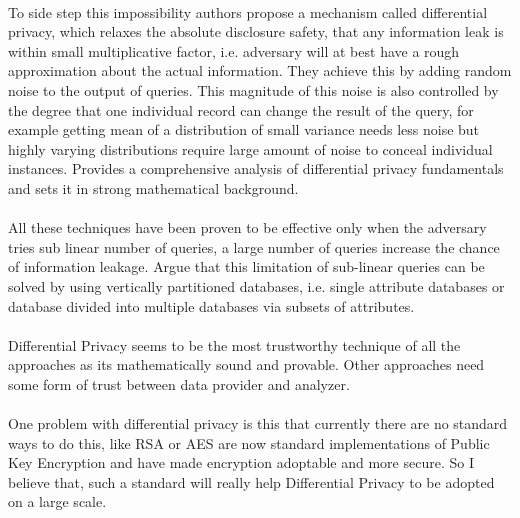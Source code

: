 \documentclass[12pt]{report}
\begin{document}
\paragraph{}
To side step this impossibility authors propose a mechanism called differential privacy, which relaxes the absolute disclosure safety, that any information leak is within small multiplicative factor, i.e. adversary will at best have a rough approximation about the actual information. They achieve this by adding random noise to the output of queries. This magnitude of this noise is also controlled by the degree that one individual record can change the result of the query, for example getting mean of a distribution of small variance needs less noise but highly varying distributions require large amount of noise to conceal individual instances. \cite{dwork2014algorithmic} Provides a comprehensive analysis of differential privacy fundamentals and sets it in strong mathematical background. 
\paragraph{}
All these techniques have been proven to be effective only when the adversary tries sub linear number of queries, a large number of queries increase the chance of information leakage\cite{haeberlen2011differential}. \cite{dwork2004privacy} Argue that this limitation of sub-linear queries can be solved by using vertically partitioned databases, i.e. single attribute databases or database divided into multiple databases via subsets of attributes.
\paragraph{}
Differential Privacy seems to be the most trustworthy technique of all the approaches as its mathematically sound and provable. Other approaches need some form of trust between data provider and analyzer.
\paragraph{}
One problem with differential privacy is this that currently there are no standard ways to do this, like RSA or AES are now standard implementations of Public Key Encryption and have made encryption adoptable and more secure. So I believe that, such a standard will really help Differential Privacy to be adopted on a large scale.



\newcommand{\dd}[1]{\mathrm{d}#1}
\end{document}
